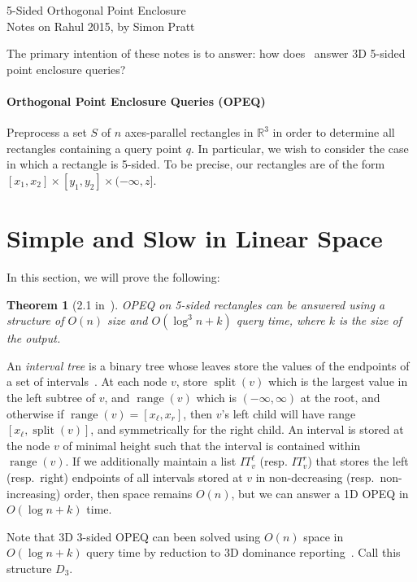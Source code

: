 \documentclass[letterpaper,12pt,twocolumn]{article}
\DeclareMathOperator{\splt}{split}
\DeclareMathOperator{\range}{range}
\newcommand{\BigOh}[1]{O\!\left(#1\right)}
\newcommand\IR{\mathbb{R}}
\newcommand\D[1]{$D_{#1}$}
\newcommand\bounds[1]{[#1]}
\newcommand\lbounds[1]{(#1]} %
\theoremstyle{plain}
\newtheorem{theorem}{Theorem}
\begin{document}
{\noindent\Large 5-Sided Orthogonal Point Enclosure}\\
{\noindent Notes on Rahul 2015, by Simon Pratt}

The primary intention of these notes is to answer: how
does~\cite{saladi2015improved} answer 3D 5-sided point enclosure
queries?

\paragraph{Orthogonal Point Enclosure Queries (OPEQ)}
Preprocess a set $S$ of $n$ axes-parallel rectangles in $\IR^3$ in
order to determine all rectangles containing a query point $q$.  In
particular, we wish to consider the case in which a rectangle is
5-sided.  To be precise, our rectangles are of the form
$\bounds{x_1,x_2} \times \bounds{y_1, y_2} \times \lbounds{-\infty,z}$.

\section{Simple and Slow in Linear Space}

In this section, we will prove the following:

\begin{theorem}[2.1 in~\cite{saladi2015improved}]

  OPEQ on 5-sided rectangles can be answered using a structure of
  $\BigOh{n}$ size and $\BigOh{\log^3 n + k}$ query time, where $k$
  is the size of the output.

\end{theorem}

An \emph{interval tree} is a binary tree whose leaves store the values
of the endpoints of a set of intervals~\cite{edelsbrunner1983new}.  At
each node $v$, store $\splt(v)$ which is the largest value in the left
subtree of $v$, and $\range(v)$ which is $(-\infty,\infty)$ at the
root, and otherwise if $\range(v) = [x_\ell, x_r]$, then $v$'s left
child will have range $[x_\ell, \splt(v)]$, and symmetrically for the
right child.  An interval is stored at the node $v$ of minimal height
such that the interval is contained within $\range(v)$.  If we
additionally maintain a list $IT_v^\ell$ (resp. $IT_v^r$) that stores
the left (resp.\ right) endpoints of all intervals stored at $v$ in
non-decreasing (resp.\ non-increasing) order, then space remains
$\BigOh{n}$, but we can answer a 1D OPEQ in $\BigOh{\log n + k}$ time.

Note that 3D 3-sided OPEQ can been solved using $\BigOh{n}$ space in
$\BigOh{\log n + k}$ query time by reduction to 3D dominance
reporting~\cite{afshani2008dominance,makris2012improved}.  Call this
structure \D{3}.
\end{document}
